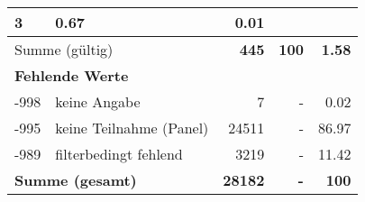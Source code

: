 \begin{longtable}{lXrrr}
       \num{3} &
       \num[round-mode=places,round-precision=2]{0,67} &
         \num[round-mode=places,round-precision=2]{0,01} \\
     \midrule
     \multicolumn{2}{l}{Summe (gültig)} &
       \textbf{\num{445}} &
     \textbf{100} &
       \textbf{\num[round-mode=places,round-precision=2]{1,58}} \\
     \multicolumn{5}{l}{\textbf{Fehlende Werte}}\\
       -998 &
       keine Angabe &
         \num{7} &
        - &
         \num[round-mode=places,round-precision=2]{0,02} \\
       -995 &
       keine Teilnahme (Panel) &
         \num{24511} &
        - &
         \num[round-mode=places,round-precision=2]{86,97} \\
       -989 &
       filterbedingt fehlend &
         \num{3219} &
        - &
         \num[round-mode=places,round-precision=2]{11,42} \\
     \midrule
     \multicolumn{2}{l}{\textbf{Summe (gesamt)}} &
          \textbf{\num{28182}} &
        \textbf{-} &
        \textbf{100} \\
     \bottomrule
     \end{longtable}
     
